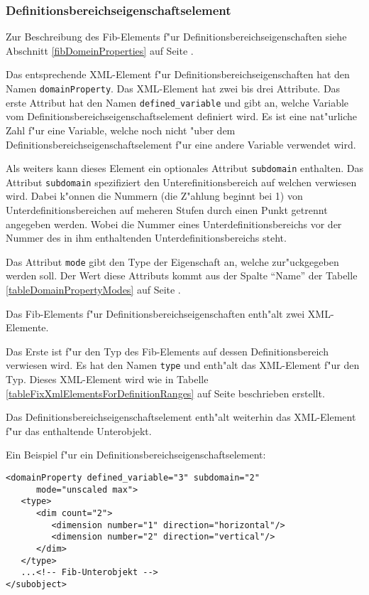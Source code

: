 

\subsubsection{Definitionsbereichseigenschaftselement}

Zur Beschreibung des Fib-Elements f"ur Definitionsbereichseigenschaften siehe Abschnitt \ref{fibDomeinProperties} auf Seite \pageref{fibDomeinProperties} .

Das entsprechende XML-Element f"ur Definitionsbereichseigenschaften hat den Namen \verb|domainProperty|. Das XML-Element hat zwei bis drei Attribute. Das erste Attribut hat den Namen \verb|defined_variable| und gibt an, welche Variable vom Definitionsbereichseigenschaftselement definiert wird. Es ist eine nat"urliche Zahl f"ur eine Variable, welche noch nicht "uber dem Definitionsbereichseigenschaftselement f"ur eine andere Variable verwendet wird.

Als weiters kann dieses Element ein optionales Attribut \verb|subdomain| enthalten. Das Attribut \verb|subdomain| spezifiziert den Unterefinitionsbereich auf welchen verwiesen wird. Dabei k"onnen die Nummern (die Z"ahlung beginnt bei 1) von Unterdefinitionsbereichen auf meheren Stufen durch einen Punkt getrennt angegeben werden. Wobei die Nummer eines Unterdefinitionsbereichs vor der Nummer des in ihm enthaltenden Unterdefinitionsbereichs steht.

Das Attribut \verb|mode| gibt den Type der Eigenschaft an, welche zur"uckgegeben werden soll. Der Wert diese Attributs kommt aus der Spalte ``Name'' der Tabelle \ref{tableDomainPropertyModes} auf Seite \pageref{tableDomainPropertyModes} .

Das Fib-Elements f"ur Definitionsbereichseigenschaften enth"alt zwei XML-Ele\-men\-te.

Das Erste ist f"ur den Typ des Fib-Elements auf dessen Definitionsbereich verwiesen wird. Es hat den Namen \verb|type| und enth"alt das XML-Element f"ur den Typ. Dieses XML-Element wird wie in Tabelle \ref{tableFixXmlElementsForDefinitionRanges} auf Seite \pageref{tableFixXmlElementsForDefinitionRanges} beschrieben erstellt.

Das Definitionsbereichseigenschaftselement enth"alt weiterhin das XML-Element f"ur das enthaltende Unterobjekt.

\bigskip\noindent
Ein Beispiel f"ur ein Definitionsbereichseigenschaftselement:
\begin{verbatim}
<domainProperty defined_variable="3" subdomain="2"
      mode="unscaled max">
   <type>
      <dim count="2">
         <dimension number="1" direction="horizontal"/>
         <dimension number="2" direction="vertical"/>
      </dim>
   </type>
   ...<!-- Fib-Unterobjekt -->
</subobject>
\end{verbatim}

